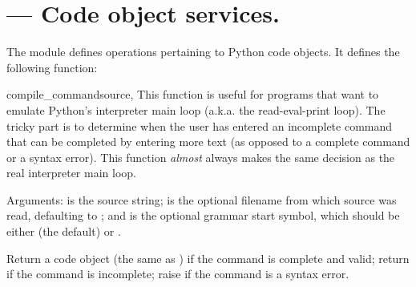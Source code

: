 \section{ ---
         Code object services.}



The  module defines operations pertaining to Python code
objects.  It defines the following function:


\begin{funcdesc}{compile_command}{source, }
This function is useful for programs that want to emulate Python's
interpreter main loop (a.k.a. the read-eval-print loop).  The tricky
part is to determine when the user has entered an incomplete command
that can be completed by entering more text (as opposed to a complete
command or a syntax error).  This function \emph{almost} always makes
the same decision as the real interpreter main loop.

Arguments:  is the source string;  is the
optional filename from which source was read, defaulting to
; and  is the optional grammar start
symbol, which should be either  (the default) or
.

Return a code object (the same as ) if the command is complete and valid;
return  if the command is incomplete; raise
 if the command is a syntax error.
\end{funcdesc}
